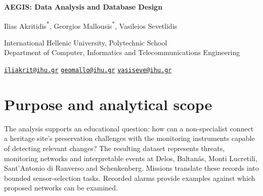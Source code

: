 \documentclass[10pt,a4paper]{article}
\begin{document}
\raggedbottom
\fontsize{10.5}{13}\selectfont
\begin{center}
{\LARGE\bfseries AEGIS: Data Analysis and Database Design\par}
\vspace{0.5em}{\large Technical Deliverable\par}
\vspace{0.6em}
Ilias Akritidis\textsuperscript{*}, Georgios Mallousis\textsuperscript{*}, Vasileios Sevetlidis\par
\vspace{0.3em}
{\small International Hellenic University, Polytechnic School\\
Department of Computer, Informatics and Telecommunications Engineering\par}
{\small\href{mailto:iliakrit@ihu.gr}{\texttt{iliakrit@ihu.gr}}\quad
\href{mailto:geomallo@ihu.gr}{\texttt{geomallo@ihu.gr}}\quad
\href{mailto:vasiseve@ihu.gr}{\texttt{vasiseve@ihu.gr}}\par}

\end{center}
{\renewcommand{\thefootnote}{\fnsymbol{footnote}}}


\section{Purpose and analytical scope}
The analysis supports an educational question: how can a non-specialist connect a heritage site's preservation challenges with the monitoring instruments capable of detecting relevant changes? The resulting dataset represents threats, monitoring networks and interpretable events at Delos, Baltan\'as, Monti Lucretili, Sant'Antonio di Ranverso and Schenkenberg. Missions translate these records into bounded sensor-selection tasks. Recorded alarms provide examples against which proposed networks can be examined.
\end{document}
